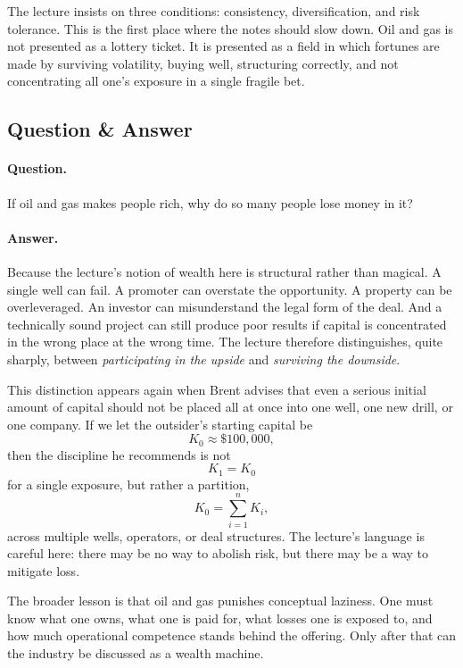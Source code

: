 The lecture insists on three conditions: consistency, diversification, and risk tolerance. This is the first place where the notes should slow down. Oil and gas is not presented as a lottery ticket. It is presented as a field in which fortunes are made by surviving volatility, buying well, structuring correctly, and not concentrating all one's exposure in a single fragile bet.

\subsection{Question \& Answer}

\paragraph{Question.} If oil and gas makes people rich, why do so many people lose money in it?

\paragraph{Answer.} Because the lecture's notion of wealth here is structural rather than magical. A single well can fail. A promoter can overstate the opportunity. A property can be overleveraged. An investor can misunderstand the legal form of the deal. And a technically sound project can still produce poor results if capital is concentrated in the wrong place at the wrong time. The lecture therefore distinguishes, quite sharply, between \emph{participating in the upside} and \emph{surviving the downside}.

This distinction appears again when Brent advises that even a serious initial amount of capital should not be placed all at once into one well, one new drill, or one company. If we let the outsider's starting capital be
\begin{equation}
K_0 \approx \$100{,}000,
\end{equation}
then the discipline he recommends is not
\[
K_1 = K_0
\]
for a single exposure, but rather a partition,
\begin{equation}
K_0 = \sum_{i=1}^{n} K_i,
\end{equation}
across multiple wells, operators, or deal structures. The lecture's language is careful here: there may be no way to abolish risk, but there may be a way to mitigate loss.

The broader lesson is that oil and gas punishes conceptual laziness. One must know what one owns, what one is paid for, what losses one is exposed to, and how much operational competence stands behind the offering. Only after that can the industry be discussed as a wealth machine.

